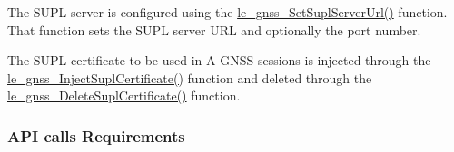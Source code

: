 The S\+U\+P\+L server is configured using the \hyperlink{le__gnss__interface_8h_abff6d8ae251972df157b5b38829230ed}{le\+\_\+gnss\+\_\+\+Set\+Supl\+Server\+Url()} function. That function sets the S\+U\+P\+L server U\+R\+L and optionally the port number.

The S\+U\+P\+L certificate to be used in A-\/\+G\+N\+S\+S sessions is injected through the \hyperlink{le__gnss__interface_8h_a3bd8f5067d4bba2e7ed5fce95c2c1a74}{le\+\_\+gnss\+\_\+\+Inject\+Supl\+Certificate()} function and deleted through the \hyperlink{le__gnss__interface_8h_aec8d50c209ce21a979b7e9f552353aec}{le\+\_\+gnss\+\_\+\+Delete\+Supl\+Certificate()} function.\hypertarget{c_gnss_le_gnss_APIcallsRequirements}{}\subsubsection{A\+P\+I calls Requirements}\label{c_gnss_le_gnss_APIcallsRequirements}
